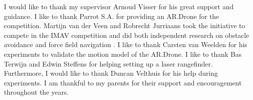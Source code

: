 I would like to thank my supervisor Arnoud Visser for his great support and guidance. %
I like to thank Parrot S.A. for providing an AR.Drone for the competition.
Martijn van der Veen and Robrecht Jurriaans took the initiative to compete in the IMAV competition and did both independent research on obstacle avoidance \cite{Jurriaans2011} and force field navigation \cite{VanDerVeen2011}.
I like to thank Carsten van Weelden for his experiments to validate the motion model of the AR.Drone. 
I like to thank Bas Terwijn and Edwin Steffens for helping setting up a laser rangefinder.
Furthermore, I would like to thank Duncan Velthuis for his help during experiments.
I am thankful to my parents for their support and encouragement throughout the years.